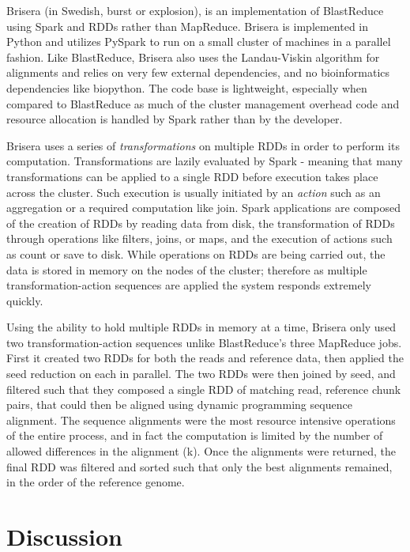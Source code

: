 \documentclass[conference,letterpaper,11pt]{IEEEtran}
\begin{document}
	Brisera (in Swedish, burst or explosion), is an implementation of BlastReduce using Spark and RDDs rather than MapReduce. Brisera is implemented in Python and utilizes PySpark to run on a small cluster of machines in a parallel fashion. Like BlastReduce, Brisera also uses the Landau-Viskin algorithm for alignments and relies on very few external dependencies, and no bioinformatics dependencies like biopython. The code base is lightweight, especially when compared to BlastReduce as much of the cluster management overhead code and resource allocation is handled by Spark rather than by the developer. 
    
    Brisera uses a series of \textit{transformations} on multiple RDDs in order to perform its computation. Transformations are lazily evaluated by Spark - meaning that many transformations can be applied to a single RDD before execution takes place across the cluster. Such execution is usually initiated by an \textit{action} such as an aggregation or a required computation like join. Spark applications are composed of the creation of RDDs by reading data from disk, the transformation of RDDs through operations like filters, joins, or maps, and the execution of actions such as count or save to disk. While operations on RDDs are being carried out, the data is stored in memory on the nodes of the cluster; therefore as multiple transformation-action sequences are applied the system responds extremely quickly. 
    
    Using the ability to hold multiple RDDs in memory at a time, Brisera only used two transformation-action sequences unlike BlastReduce's three MapReduce jobs. First it created two RDDs for both the reads and reference data, then applied the seed reduction on each in parallel. The two RDDs were then joined by seed, and filtered such that they composed a single RDD of matching read, reference chunk pairs, that could then be aligned using dynamic programming sequence alignment. The sequence alignments were the most resource intensive operations of the entire process, and in fact the computation is limited by the number of allowed differences in the alignment (k). Once the alignments were returned, the final RDD was filtered and sorted such that only the best alignments remained, in the order of the reference genome. 

\section{Discussion}
\end{document}
